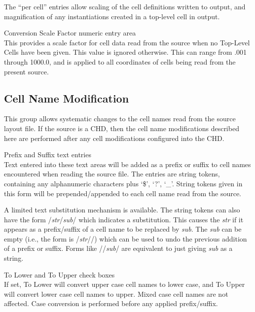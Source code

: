 The ``per cell'' entries allow scaling of the cell definitions written
to output, and magnification of any instantiations created in a
top-level cell in output.

\begin{description}
\item{{\cb Conversion Scale Factor} numeric entry area}\\
This provides a scale factor for cell data read from the source when
no {\cb Top-Level Cells} have been given.  This value is ignored
otherwise.  This can range from .001 through 1000.0, and is applied to
all coordinates of cells being read from the present source.
\end{description}

\subsection{Cell Name Modification}

This group allows systematic changes to the cell names read from the
source layout file.  If the source is a CHD, then the cell name
modifications described here are performed after any cell
modifications configured into the CHD.

\begin{description}
\item{{\cb Prefix} and {\cb Suffix} text entries}\\
Text entered into these text areas will be added as a prefix or suffix
to cell names encountered when reading the source file.  The entries
are string tokens, containing any alphanumeric characters plus `\$',
`?', `\_'.  String tokens given in this form will be
prepended/appended to each cell name read from the source.

A limited text substitution mechanism is available.  The string tokens
can also have the form /{\it str\/}/{\it sub\/}/ which indicates a
substitution.  This causes the {\it str} if it appears as a
prefix/suffix of a cell name to be replaced by {\it sub}.  The {\it
sub} can be empty (i.e., the form is /{\it str\/}//) which can be used
to undo the previous addition of a prefix or suffix.  Forms like
//{\it sub\/}/ are equivalent to just giving {\it sub} as a string.

\item{{\cb To Lower} and {\cb To Upper} check boxes}\\
If set, {\cb To Lower} will convert upper case cell names to lower
case, and {\cb To Upper} will convert lower case cell names to upper. 
Mixed case cell names are not affected.  Case conversion is performed
before any applied prefix/suffix.
\end{description}

